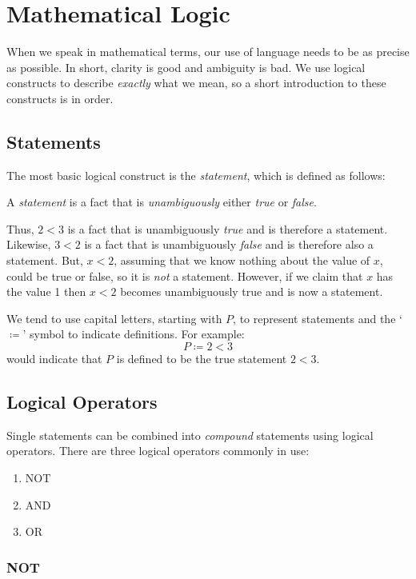 \documentclass[letterpaper,12pt,fleqn]{article}
\begin{document}
\section*{Mathematical Logic}

When we speak in mathematical terms, our use of language needs to be as precise
as possible. In short, clarity is good and ambiguity is bad. We use logical
constructs to describe \emph{exactly} what we mean, so a short introduction to
these constructs is in order.

\subsection*{Statements}

The most basic logical construct is the \emph{statement}, which is defined as
follows:

\begin{definition}[Statement]
A \emph{statement} is a fact that is \emph{unambiguously} either \emph{true} or
\emph{false}.
\end{definition}

Thus, $2<3$ is a fact that is unambiguously \emph{true} and is therefore a
statement.  Likewise, $3<2$ is a fact that is unambiguously \emph{false} and is
therefore also a statement. But, $x<2$, assuming that we know nothing about the
value of $x$, could be true or false, so it is \emph{not} a statement. However,
if we claim that $x$ has the value 1 then $x<2$ becomes unambiguously true and
is now a statement.

We tend to use capital letters, starting with $P$, to represent statements and
the `$\coloneqq$' symbol to indicate definitions.  For example:
\[P\coloneqq2<3\]
would indicate that $P$ is defined to be the true statement $2<3$.

\subsection*{Logical Operators}

Single statements can be combined into \emph{compound} statements using logical
operators. There are three logical operators commonly in use:
\begin{enumerate}
\item NOT
\item AND
\item OR
\end{enumerate}

\subsubsection*{NOT}
\end{document}
